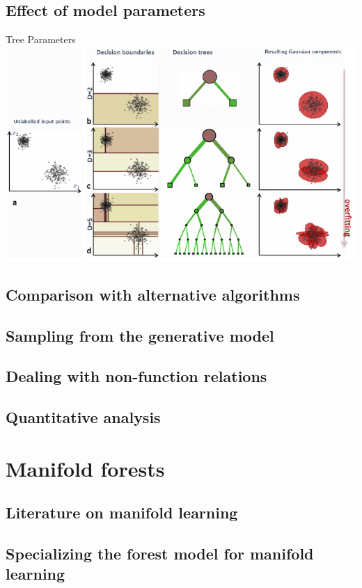 \documentclass[11pt,aspectratio=1610,usenames,dvipsnames]{beamer} %
\begin{document}
\subsection{Effect of model parameters}%
\begin{frame}{Tree Parameters}
		\includegraphics[scale = 1.0]{figures/decisionForests-42.pdf}
\end{frame}

\subsection{Comparison with alternative algorithms}%
\subsection{Sampling from the generative model}%
\subsection{Dealing with non-function relations}%
\subsection{Quantitative analysis}%
\section{Manifold forests}%
\subsection{Literature on manifold learning}%
\subsection{Specializing the forest model for manifold learning}%
\end{document}
